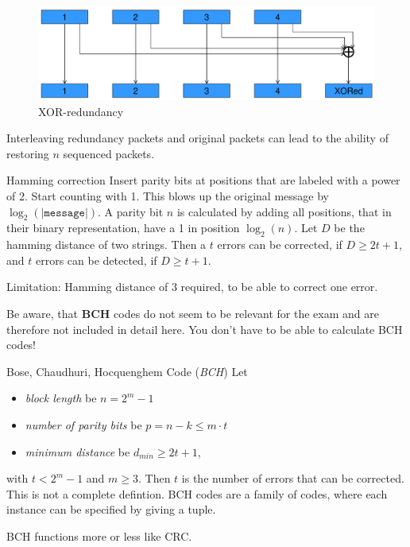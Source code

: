 \documentclass[english]{panikzettel}
\begin{document}
	\begin{figure}[H]
		\centering
		\includegraphics[width=\textwidth]{img/2-xor-redundancy.png}
		\caption{XOR-redundancy}
		\label{img-2-xor-redundancy}
	\end{figure}	

	Interleaving redundancy packets and original packets can lead to the ability of restoring \( n \) sequenced packets.
	
	\begin{defi}{Hamming correction}
		Insert parity bits at positions that are labeled with a power of 2.
		Start counting with 1.
		This blows up the original message by \( \log_2(|\texttt{message}|) \).
		A parity bit \( n \) is calculated by adding all positions, that in their binary representation, have a 1 in position \( \log_2(n) \).
		\tcblower
		Let \( D \) be the hamming distance of two strings.
		Then a \( t \) errors can be corrected, if \( D \geq 2t + 1 \), and \( t \) errors can be detected, if \( D \geq t + 1 \).
	\end{defi}

	Limitation: Hamming distance of 3 required, to be able to correct one error.

	\begin{alertbox}
		Be aware, that \textbf{BCH} codes do not seem to be relevant for the exam and are therefore not included in detail here.
		\tcblower
		You don't have to be able to calculate BCH codes!
	\end{alertbox}

	\begin{defi}{Bose, Chaudhuri, Hocquenghem Code (\textit{BCH})}
		Let 
		\begin{itemize}
			\item \textit{block length} be \( n = 2^m -1 \)
			\item \textit{number of parity bits } be \( p = n - k \leq m \cdot t \)
			\item \textit{minimum distance} be \( d_{min} \geq 2t + 1 \),
		\end{itemize}
		with \( t < 2^{m} - 1 \) and \( m \geq 3 \). 
		Then \( t \) is the number of errors that can be corrected. 
		\tcblower
		This is not a complete defintion. 
		BCH codes are a family of codes, where each instance can be specified by giving a tuple.
	\end{defi}
	BCH functions more or less like CRC.
	
\end{document}
